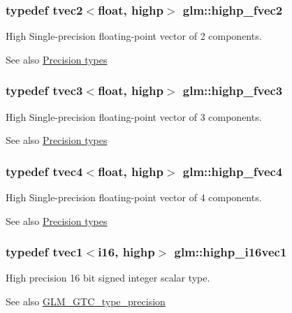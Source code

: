 \subsubsection[{highp\+\_\+fvec2}]{\setlength{\rightskip}{0pt plus 5cm}typedef tvec2$<$float, highp$>$ {\bf glm\+::highp\+\_\+fvec2}}\label{namespaceglm_a7626c78159b590e2db6b8a8e4c2ea655}
High Single-\/precision floating-\/point vector of 2 components. \begin{DoxySeeAlso}{See also}
\hyperlink{group__core__precision}{Precision types} 
\end{DoxySeeAlso}
\hypertarget{namespaceglm_ab0a3090b342f2a6f85a1c0b3b9f818f8}{}
\subsubsection[{highp\+\_\+fvec3}]{\setlength{\rightskip}{0pt plus 5cm}typedef tvec3$<$float, highp$>$ {\bf glm\+::highp\+\_\+fvec3}}\label{namespaceglm_ab0a3090b342f2a6f85a1c0b3b9f818f8}
High Single-\/precision floating-\/point vector of 3 components. \begin{DoxySeeAlso}{See also}
\hyperlink{group__core__precision}{Precision types} 
\end{DoxySeeAlso}
\hypertarget{namespaceglm_a42aa7520bab0f5baf5ad92ebcc257eb5}{}
\subsubsection[{highp\+\_\+fvec4}]{\setlength{\rightskip}{0pt plus 5cm}typedef tvec4$<$float, highp$>$ {\bf glm\+::highp\+\_\+fvec4}}\label{namespaceglm_a42aa7520bab0f5baf5ad92ebcc257eb5}
High Single-\/precision floating-\/point vector of 4 components. \begin{DoxySeeAlso}{See also}
\hyperlink{group__core__precision}{Precision types} 
\end{DoxySeeAlso}
\hypertarget{namespaceglm_a741838c5e5f121568ab45e2605168a87}{}
\subsubsection[{highp\+\_\+i16vec1}]{\setlength{\rightskip}{0pt plus 5cm}typedef tvec1$<${\bf i16}, highp$>$ {\bf glm\+::highp\+\_\+i16vec1}}\label{namespaceglm_a741838c5e5f121568ab45e2605168a87}
High precision 16 bit signed integer scalar type. \begin{DoxySeeAlso}{See also}
\hyperlink{group__gtc__type__precision}{G\+L\+M\+\_\+\+G\+T\+C\+\_\+type\+\_\+precision} 
\end{DoxySeeAlso}
\hypertarget{namespaceglm_a9a46126d0bf9ceb121df6109ac8da717}{}
